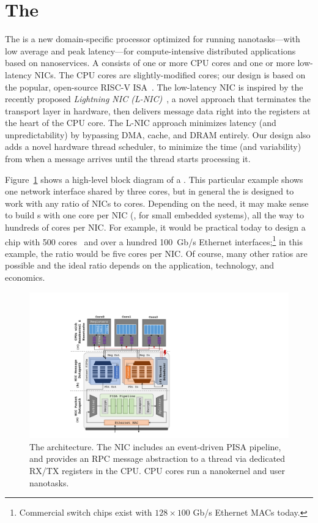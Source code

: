 \section{The \name{}}
\label{sec:nanoPU}
The \name{} is a new domain-specific processor optimized for running nanotasks---with low average and peak latency---for compute-intensive distributed applications based on nanoservices. 
A \name{} consists of one or more CPU cores and one or more low-latency NICs. 
The CPU cores are slightly-modified cores; our design is based on the popular, open-source RISC-V ISA~\cite{riscv}. 
The low-latency NIC is inspired by the recently proposed {\em Lightning NIC (L-NIC)}~\cite{lnic}, a novel approach that terminates the transport layer in hardware, then delivers message data right into the registers at the heart of the CPU core.  
The L-NIC approach minimizes latency (and unpredictability) by bypassing DMA, cache, and DRAM entirely. 
Our \name{} design also adds a novel hardware thread scheduler, to minimize the time (and variability) from when a message arrives until the thread starts processing it.

Figure~\ref{fig:nanoPU} shows a high-level block diagram of a \name{}. 
This particular example shows one network interface shared by three cores, but in general the \name{} is designed to work with any ratio of NICs to cores. 
Depending on the need, it may make sense to build \name{}s with one core per NIC (\eg, for small embedded systems), all the way to hundreds of cores per NIC. 
For example, it would be practical today to design a chip with 500 cores~\cite{celerity, kilocore} and over a hundred \SI{100}{Gb/s} Ethernet interfaces;\footnote{Commercial switch chips exist with $128\times 100$ Gb/s Ethernet MACs today.} in this example, the ratio would be five cores per NIC. 
Of course, many other ratios are possible and the ideal ratio depends on the application, technology, and economics. 

\begin{figure}
  \includegraphics[width=0.9\linewidth]{./figures/nanopu-arch}
  \caption{The \name{} architecture. The NIC includes an event-driven PISA pipeline, and provides an RPC message abstraction to a thread via dedicated RX/TX registers in the CPU. CPU cores run a nanokernel and user nanotasks.}
  \label{fig:nanoPU}
\end{figure}

